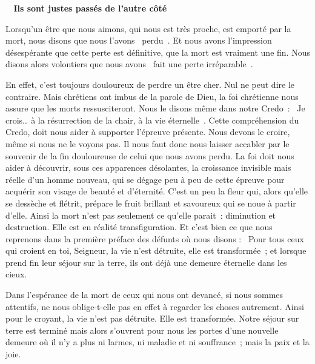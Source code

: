  \begin{center}
 \textbf{
\og 
\og Ils sont justes passés de l’autre côté\fg{}
 \fg{}
 }
 \end{center}

Lorsqu’un être que nous aimons, qui nous est très proche, est emporté par la mort, nous disons que nous l’avons \og perdu \fg. Et nous avons l’impression désespérante que cette perte est définitive, que la mort est vraiment une fin. Nous disons alors volontiers que nous avons \og fait une perte irréparable \fg.

En effet, c’est toujours douloureux de perdre un être cher. Nul ne peut dire le contraire. Mais chrétiens ont imbus de la parole de Dieu, la foi chrétienne nous assure que les morts ressusciteront. Nous le disons même dans notre Credo :
\og Je crois\dots{} à la résurrection de la chair, à la vie éternelle \fg{}. Cette compréhension du Credo, doit nous aider à supporter l’épreuve présente.
Nous devons le croire, même si nous ne le voyons pas. Il nous faut donc nous laisser accabler par le souvenir de la fin douloureuse de celui que nous avons perdu. La foi doit nous aider à découvrir, sous ces apparences désolantes, la croissance invisible mais réelle d’un homme nouveau, qui se dégage peu à peu de cette épreuve pour acquérir son visage de beauté et d’éternité. C’est un peu la fleur qui, alors qu’elle se dessèche et flétrit, prépare le fruit brillant et savoureux qui se noue à partir d’elle. Ainsi la mort n’est pas seulement ce qu’elle parait :
diminution et destruction. Elle est en réalité transfiguration. Et c’est bien ce que nous reprenons dans la première préface des défunts où nous disons :
\og Pour tous ceux qui croient en toi, Seigneur, la vie n’est détruite, elle est transformée ; et lorsque prend fin leur séjour sur la terre, ils ont déjà une demeure éternelle dans les cieux. \fg{}

Dans l’espérance de la mort de ceux qui nous ont devancé, si nous sommes attentifs, ne nous oblige-t-elle pas en effet à regarder les choses autrement. Ainsi pour le croyant, la vie n’est pas détruite. Elle est transformée. Notre séjour sur terre est terminé mais alors s’ouvrent pour nous les portes d’une nouvelle demeure où il n’y a plus ni larmes, ni maladie et ni souffrance ; mais la paix et la joie.

